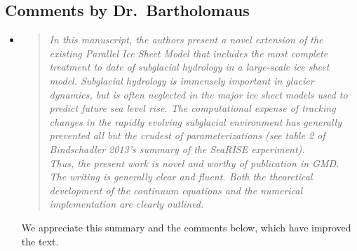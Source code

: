 \documentclass[11pt,reqno]{amsart}
\newcommand{\reply}[2]{
\medskip\medskip
\item  \begin{quote}
\emph{#1}
\end{quote}

\medskip
\noindent #2}
\begin{document}
\subsection*{Comments by Dr.~Bartholomaus}\begin{itemize}

\reply{In this manuscript, the authors present a novel extension of the existing Parallel Ice Sheet Model that includes the most complete treatment to date of subglacial hydrology in a large-scale ice sheet model.  Subglacial hydrology is immensely important in glacier dynamics, but is often neglected in the major ice sheet models used to predict future sea level rise.  The computational expense of tracking changes in the rapidly evolving subglacial environment has generally prevented all but the crudest of parameterizations (see table 2 of Bindschadler 2013's summary of the SeaRISE experiment).\\
Thus, the present work is novel and worthy of publication in GMD.  The writing is generally clear and fluent.  Both the theoretical development of the continuum equations and the numerical implementation are clearly outlined.}
{We appreciate this summary and the comments below, which have improved the text.}


\end{itemize}
\end{document}
